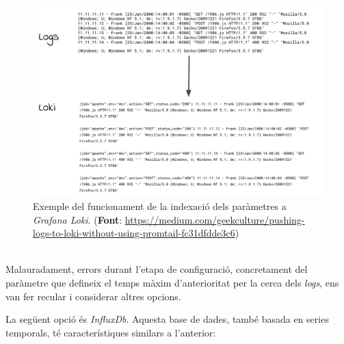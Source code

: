 \clearpage

\begin{figure}[htbp]
    \centerline{\includegraphics[width=1\textwidth]{figures/loki-indexing}}
    \captionsetup{justification=centering}
    \caption{Exemple del funcionament de la indexació dels paràmetres a \textit{Grafana Loki}. (\textbf{Font}: \url{https://medium.com/geekculture/pushing-logs-to-loki-without-using-promtail-fc31dfdde3c6})}\label{fig:loki-indexing}
\end{figure}

\noindent \\
Malauradament, errors durant l’etapa de configuració, concretament del paràmetre que defineix el temps màxim d'anterioritat per la cerca dels \textit{\gls{log}s}, ens van fer recular i considerar altres opcions.

\clearpage

\noindent
La següent opció és \textit{InfluxDb}.
Aquesta base de dades, també basada en series temporals, té característiques similars a l’anterior:

